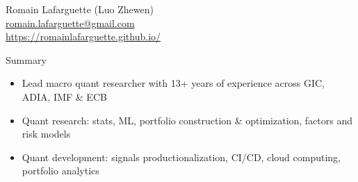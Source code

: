 \documentclass[usegeometry, 10pt, a4paper]{cv} %
\begin{document}
\hspace{10mm}
\begin{chapeau}
\begin{adresse}
\begin{flushleft}
    Romain Lafarguette (Luo Zhewen)\\
    \href{mailto:romain.lafarguette@gmail.com}{romain.lafarguette@gmail.com}\\
    \url{https://romainlafarguette.github.io/} \\
\end{flushleft}
\end{adresse}
\end{chapeau}

\vspace{-0.5cm}

\begin{rubriquetableau}[0.95\textwidth]{Summary}\\
  \vspace{-1cm}
  \begin{itemize}
  \item Lead macro quant researcher with 13+ years of experience across GIC, ADIA, IMF \& ECB
  \item Quant research: stats, ML, portfolio construction \& optimization, factors and risk models
  \item Quant development: signals productionalization, CI/CD, cloud computing, portfolio analytics
  \end{itemize}

\end{rubriquetableau}

\vspace{0.2cm}

\end{document}
